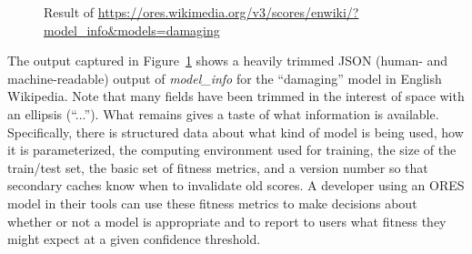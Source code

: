 \begin{figure}[htbp]
        \caption{Result of \url{https://ores.wikimedia.org/v3/scores/enwiki/?model_info&models=damaging}}
        \label{fig:english_damaging_model_info}
\end{figure}

The output captured in Figure~\ref{fig:english_damaging_model_info} shows a heavily trimmed JSON (human- and machine-readable) output of \emph{model\_info} for the ``damaging'' model in English Wikipedia.  Note that many fields have been trimmed in the interest of space with an ellipsis (``...'').  What remains gives a taste of what information is available.  Specifically, there is structured data about what kind of model is being used, how it is parameterized, the computing environment used for training, the size of the train/test set, the basic set of fitness metrics, and a version number so that secondary caches know when to invalidate old scores.  A developer using an ORES model in their tools can use these fitness metrics to make decisions about whether or not a model is appropriate and to report to users what fitness they might expect at a given confidence threshold.

